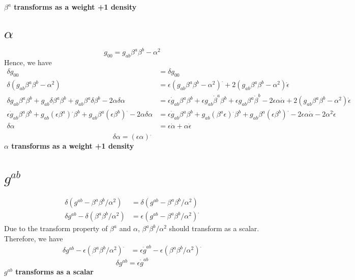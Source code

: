 \documentclass{article}
\begin{document}
{\bf{\color{red}$\beta^{a}$ transforms as a weight +1 density} }
\section{$\alpha$}
\[
g_{00} = g_{ab}\beta^{a}\beta^{b}-\alpha^{2}
\]
Hence, we have
\begin{align*}
\delta g_{00} & = \delta g_{00} \\
\delta (g_{ab}\beta^{a}\beta^{b} - \alpha^{2}) & = \epsilon (g_{ab}\beta^{a}\beta^{b} - \alpha^2)^{.} + 2(g_{ab}\beta^{a}\beta^{b} - \alpha^2) {\dot \epsilon}\\
\delta g_{ab} \beta^{a} \beta^{b} + g_{ab} \delta \beta^{a} \beta^{b} + g_{ab} \beta^{a} \delta \beta^{b} - 2\alpha \delta \alpha & = \epsilon {\dot g}_{ab}\beta^{a}\beta^{b} + \epsilon g_{ab} {\dot \beta}^{a} \beta^{b} + \epsilon g_{ab} \beta^{a} {\dot \beta}^{b} - 2\epsilon \alpha {\dot \alpha}  + 2(g_{ab}\beta^{a}\beta^{b} - \alpha^2) {\dot \epsilon}\\
\epsilon {\dot g}_{ab} \beta^{a} \beta^{b} + g_{ab}(\epsilon \beta^{a})^{.}\beta^{b} + g_{ab} \beta^{a} (\epsilon \beta^{b})^{.} - 2\alpha\delta\alpha & = \epsilon {\dot g}_{ab}\beta^{a}\beta^{b} + g_{ab} (\beta^{a} \epsilon)^{.} \beta^{b} + g_{ab} \beta^{a} (\epsilon \beta^{b})^{.} - 2\epsilon \alpha {\dot \alpha}  - 2\alpha^2 {\dot \epsilon}\\
\delta \alpha & = \epsilon {\dot \alpha} + \alpha {\dot \epsilon}\\
\end{align*}
\[
\boxed{
\delta \alpha  = (\epsilon \alpha)^{.}
}
\]
{\bf{\color {red}$\alpha$ transforms as a weight +1 density} }
\section{$g^{ab}$}
\begin{align*}
\delta (g^{ab} - \beta^{a}\beta^{b}/\alpha^2) & = \delta (g^{ab} - \beta^{a}\beta^{b}/\alpha^2)\\
\delta g^{ab} - \delta(\beta^{a}\beta^{b}/\alpha^2) & = \epsilon (g^{ab} - \beta^{a}\beta^{b}/\alpha^2)^{.}
\end{align*}
Due to the transform property of $\beta^{a}$ and $\alpha$, $\beta^{a}\beta^{b}/\alpha^2$ should transform as a scalar. Therefore, we have
\begin{align*}
\delta g^{ab} - \epsilon (\beta^{a}\beta^{b}/\alpha^{2})^{.} & = \epsilon {\dot g}^{ab} - \epsilon (\beta^{a}\beta^{b}/\alpha^2)^{.}
\end{align*}
\[
\boxed{
\delta g^{ab} = \epsilon {\dot g^{ab}}
}
\]
{\bf {\color{red} $g^{ab}$ transforms as a scalar}}\\
\end{document}
